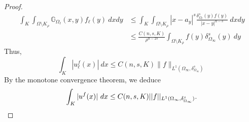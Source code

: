 \documentclass{amsart}
\newcommand{\gk}[1]{\mathbb{G}_{#1}}
\newcommand{\ul}{u_{\ell}}
\begin{document}
\begin{proof}
        \begin{equation*}
            \begin{split}
              \int_{K}\int_{\Omega\setminus K_{\rho}}\gk{\Omega_{\ell}}(x,y) f_{\ell}(y)\ dxdy &\leq \int_{K}\int_{\Omega\setminus K_{\rho}} |x-a_y|^{s}\frac{\delta_{\Omega_{\ell}}^{s}(y)f(y)}{|x-y|^{n-s}}\ dxdy\\
              &\leq \frac{C(n,s,K)}{\rho^{n-2s}}\int_{\Omega\setminus K_{\rho}}f(y)\delta_{\Omega_{\infty}}^{s}(y)\ dy
            \end{split}
        \end{equation*}
       Thus,
       \begin{equation*}
           \int_{K}|\ul^{f}(x)|\ dx\leq C(n,s,K)\|f\|_{L^{1}(\Omega_{\infty},\delta^{s}_{\Omega_{\infty}})}
       \end{equation*}
         By the monotone convergence theorem, we deduce 
        \begin{equation*}
            \int_{K}|u^{f}(x)|\ dx \leq C(n,s,K)||f||_{L^{1}(\Omega_{\infty},\delta^{s}_{\Omega_{\infty}})}.\qedhere
        \end{equation*}
\end{proof}
\end{document}
